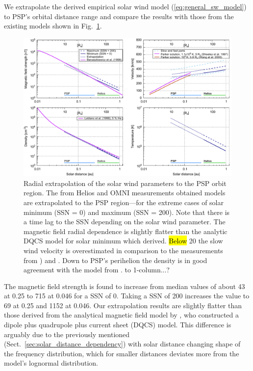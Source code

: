 We extrapolate the derived empirical solar wind model (\ref{eq:general_sw_model}) to PSP’s orbital distance range and compare the results with those from the existing models shown in Fig.~\ref{fig:sw_extrapolation_ssn_b_plot}.
\begin{figure}
	\includegraphics[width=18cm]{figures/sw_extrapolation_ssn_b_plot.pdf}
	\caption{Radial extrapolation of the solar wind parameters to the PSP orbit region. The from Helios and OMNI measurements obtained models are extrapolated to the PSP region---for the extreme cases of solar minimum (SSN = 0) and maximum (SSN = 200). Note that there is a time lag to the SSN depending on the solar wind parameter. The magnetic field radial dependence is slightly flatter than the analytic DQCS model for solar minimum which \citet{Banaszkiewicz1998} derived. \hl{Below} \SI{20}{\Rs} the slow wind velocity is overestimated in comparison to the measurements from \citet{Wang2000}) and \citet{Sheeley1997}. Down to PSP's perihelion the density is in good agreement with the model from \citet{Leblanc1998}. to 1-column...?}
	\label{fig:sw_extrapolation_ssn_b_plot}
\end{figure}

The magnetic field strength is found to increase from median values of about \SI{43}{\nT} at \SI{0.25}{\au} to \SI{715}{\nT} at \SI{0.046}{\au} for a SSN of 0. Taking a SSN of 200 increases the value to \SI{69}{\nT} at \SI{0.25}{\au} and \SI{1152}{\nT} at \SI{0.046}{\au}. Our extrapolation results are slightly flatter than those derived from the analytical magnetic field model by \citet{Banaszkiewicz1998}, who constructed a dipole plus quadrupole plus current sheet (DQCS) model.
This difference is arguably due to the previously mentioned (Sect.~\ref{sec:solar_distance_dependency}) with solar distance changing shape of the frequency distribution, which for smaller distances deviates more from the model’s lognormal distribution.

